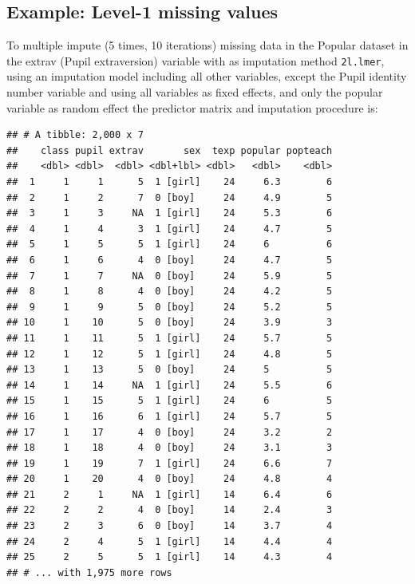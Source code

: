 \documentclass[
]{book}
\newenvironment{Shaded}{\begin{snugshade}}{\end{snugshade}}
\newcommand{\DataTypeTok}[1]{\textcolor[rgb]{0.13,0.29,0.53}{#1}}
\newcommand{\DecValTok}[1]{\textcolor[rgb]{0.00,0.00,0.81}{#1}}
\newcommand{\KeywordTok}[1]{\textcolor[rgb]{0.13,0.29,0.53}{\textbf{#1}}}
\newcommand{\NormalTok}[1]{#1}
\newcommand{\OperatorTok}[1]{\textcolor[rgb]{0.81,0.36,0.00}{\textbf{#1}}}
\newcommand{\StringTok}[1]{\textcolor[rgb]{0.31,0.60,0.02}{#1}}
\begin{document}
\hypertarget{example-level-1-missing-values}{%
\subsection{Example: Level-1 missing values}\label{example-level-1-missing-values}}

To multiple impute (5 times, 10 iterations) missing data in the Popular dataset in the extrav (Pupil extraversion) variable with as imputation method \texttt{2l.lmer}, using an imputation model including all other variables, except the Pupil identity number variable and using all variables as fixed effects, and only the popular variable as random effect the predictor matrix and imputation procedure is:

\begin{Shaded}
\end{Shaded}

\begin{verbatim}
## # A tibble: 2,000 x 7
##    class pupil extrav       sex  texp popular popteach
##    <dbl> <dbl>  <dbl> <dbl+lbl> <dbl>   <dbl>    <dbl>
##  1     1     1      5  1 [girl]    24     6.3        6
##  2     1     2      7  0 [boy]     24     4.9        5
##  3     1     3     NA  1 [girl]    24     5.3        6
##  4     1     4      3  1 [girl]    24     4.7        5
##  5     1     5      5  1 [girl]    24     6          6
##  6     1     6      4  0 [boy]     24     4.7        5
##  7     1     7     NA  0 [boy]     24     5.9        5
##  8     1     8      4  0 [boy]     24     4.2        5
##  9     1     9      5  0 [boy]     24     5.2        5
## 10     1    10      5  0 [boy]     24     3.9        3
## 11     1    11      5  1 [girl]    24     5.7        5
## 12     1    12      5  1 [girl]    24     4.8        5
## 13     1    13      5  0 [boy]     24     5          5
## 14     1    14     NA  1 [girl]    24     5.5        6
## 15     1    15      5  1 [girl]    24     6          5
## 16     1    16      6  1 [girl]    24     5.7        5
## 17     1    17      4  0 [boy]     24     3.2        2
## 18     1    18      4  0 [boy]     24     3.1        3
## 19     1    19      7  1 [girl]    24     6.6        7
## 20     1    20      4  0 [boy]     24     4.8        4
## 21     2     1     NA  1 [girl]    14     6.4        6
## 22     2     2      4  0 [boy]     14     2.4        3
## 23     2     3      6  0 [boy]     14     3.7        4
## 24     2     4      5  1 [girl]    14     4.4        4
## 25     2     5      5  1 [girl]    14     4.3        4
## # ... with 1,975 more rows
\end{verbatim}
\end{document}
